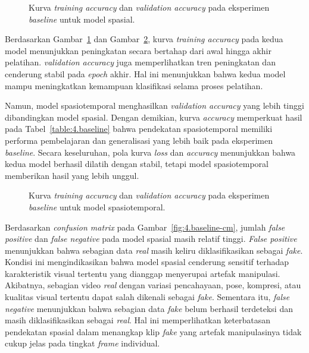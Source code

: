 \begin{figure}[htbp]
	\centering
	\caption{Kurva \textit{training accuracy} dan \textit{validation accuracy} pada eksperimen \textit{baseline} untuk model spasial.}
	\label{fig:4.baseline-acc-spatial}
\end{figure}

Berdasarkan Gambar~\ref{fig:4.baseline-acc-spatial} dan Gambar~\ref{fig:4.baseline-acc-spatiotemporal}, kurva \textit{training accuracy} pada kedua model menunjukkan peningkatan secara bertahap dari awal hingga akhir pelatihan. \textit{validation accuracy} juga memperlihatkan tren peningkatan dan cenderung stabil pada \textit{epoch} akhir. Hal ini menunjukkan bahwa kedua model mampu meningkatkan kemampuan klasifikasi selama proses pelatihan.

Namun, model spasiotemporal menghasilkan \textit{validation accuracy} yang lebih tinggi dibandingkan model spasial. Dengan demikian, kurva \textit{accuracy} memperkuat hasil pada Tabel~\ref{table:4.baseline} bahwa pendekatan spasiotemporal memiliki performa pembelajaran dan generalisasi yang lebih baik pada eksperimen \textit{baseline}. Secara keseluruhan, pola kurva \textit{loss} dan \textit{accuracy} menunjukkan bahwa kedua model berhasil dilatih dengan stabil, tetapi model spasiotemporal memberikan hasil yang lebih unggul.

\begin{figure}[htbp]
	\centering
	\caption{Kurva \textit{training accuracy} dan \textit{validation accuracy} pada eksperimen \textit{baseline} untuk model spasiotemporal.}
	\label{fig:4.baseline-acc-spatiotemporal}
\end{figure}

Berdasarkan \textit{confusion matrix} pada Gambar~\ref{fig:4.baseline-cm}, jumlah \textit{false positive} dan \textit{false negative} pada model spasial masih relatif tinggi. \textit{False positive} menunjukkan bahwa sebagian data \textit{real} masih keliru diklasifikasikan sebagai \textit{fake}. Kondisi ini mengindikasikan bahwa model spasial cenderung sensitif terhadap karakteristik visual tertentu yang dianggap menyerupai artefak manipulasi. Akibatnya, sebagian video \textit{real} dengan variasi pencahayaan, pose, kompresi, atau kualitas visual tertentu dapat salah dikenali sebagai \textit{fake}. Sementara itu, \textit{false negative} menunjukkan bahwa sebagian data \textit{fake} belum berhasil terdeteksi dan masih diklasifikasikan sebagai \textit{real}. Hal ini memperlihatkan keterbatasan pendekatan spasial dalam menangkap klip \textit{fake} yang artefak manipulasinya tidak cukup jelas pada tingkat \textit{frame} individual.

